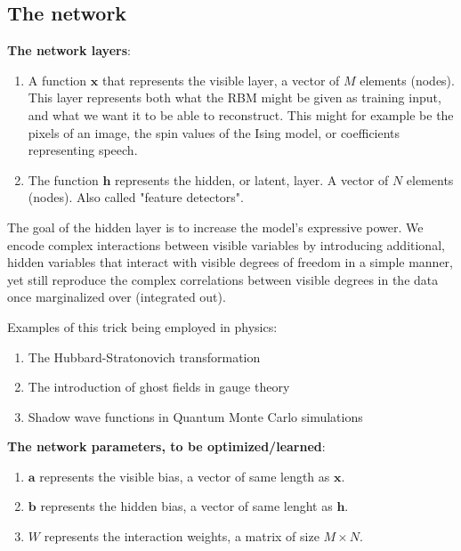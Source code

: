 \documentclass[%
oneside,                 %
final,                   %
10pt]{article}
\begin{document}
\subsection*{The network}

\textbf{The network layers}:
\begin{enumerate}
 \item A function $\mathbf{x}$ that represents the visible layer, a vector of $M$ elements (nodes). This layer represents both what the RBM might be given as training input, and what we want it to be able to reconstruct. This might for example be the pixels of an image, the spin values of the Ising model, or coefficients representing speech.

 \item The function $\mathbf{h}$ represents the hidden, or latent, layer. A vector of $N$ elements (nodes). Also called "feature detectors".
\end{enumerate}

\noindent
The goal of the hidden layer is to increase the model's expressive power. We encode complex interactions between visible variables by introducing additional, hidden variables that interact with visible degrees of freedom in a simple manner, yet still reproduce the complex correlations between visible degrees in the data once marginalized over (integrated out).

Examples of this trick being employed in physics: 
\begin{enumerate}
 \item The Hubbard-Stratonovich transformation

 \item The introduction of ghost fields in gauge theory

 \item Shadow wave functions in Quantum Monte Carlo simulations
\end{enumerate}

\noindent
\textbf{The network parameters, to be optimized/learned}:
\begin{enumerate}
 \item $\mathbf{a}$ represents the visible bias, a vector of same length as $\mathbf{x}$.

 \item $\mathbf{b}$ represents the hidden bias, a vector of same lenght as $\mathbf{h}$.

 \item $W$ represents the interaction weights, a matrix of size $M\times N$.
\end{enumerate}
\end{document}
